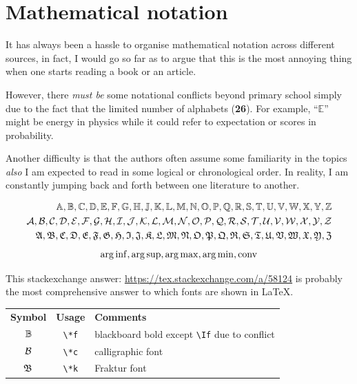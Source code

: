 \documentclass[aos,preprint]{imsart}
\begin{document}
\newpage
\section{Mathematical notation}

It has always been a hassle to organise mathematical notation across different sources,
in fact, I would go so far as to argue that this is the most annoying thing
when one starts reading a book or an article.

However, there \textit{must be} some notational conflicts beyond primary school
simply due to the fact that the limited number of alphabets (\textbf{26}).
For example, ``$\mathbb{E}$'' might be energy in physics
while it could refer to expectation or scores in probability.

Another difficulty is that the authors often assume some familiarity in the
topics
\emph{also} I am expected to read in some logical or chronological order.
In reality, I am constantly jumping back and forth between one literature to
another.

\begin{align*}
	\Af, \Bf, \Cf, \Df, \Ef, \Ff, \Gf, \Hf, \Jf, \Kf, \Lf, \Mf, \Nf, \Of, \Pf,
	\Qf, \Rf, \Sf, \Tf, \Uf, \Vf, \Wf, \Xf, \Yf, \Zf      \\
	\Ac, \Bc, \Cc, \Dc, \Ec, \Fc, \Gc, \Hc, \Ic, \Jc, \Kc, \Lc, \Mc, \Nc, \Oc,
	\Pc, \Qc, \Rc, \Sc, \Tc, \Uc, \Vc, \Wc, \Xc, \Yc, \Zc \\
	\Ak, \Bk, \Ck, \Dk, \Ek, \Fk, \Gk, \Hk, \Ik, \Jk, \Kk, \Lk, \Mk, \Nk, \Ok,
	\Pk, \Qk, \Rk, \Sk, \Tk, \Uk, \Vk, \Wk, \Xk, \Yk, \Zk
\end{align*}
$$
	\operatorname*{arg\, inf}, \operatorname*{arg\, sup}, \operatorname*{arg\, max}, \operatorname*{arg\, min}, \mathrm{conv}
$$

This stackexchange answer: \url{https://tex.stackexchange.com/a/58124}
is probably the most comprehensive answer to which fonts are shown in \LaTeX.

\begin{tabular}{ccl}
	\textbf{Symbol} & \textbf{Usage} & \textbf{Comments}                                 \\
	$\mathbb{B}$           & \verb|\*f|     & blackboard bold except \verb|\If| due to conflict \\
	$\mathcal{B}$           & \verb|\*c|     & calligraphic font                                 \\
	$\mathfrak{B}$           & \verb|\*k|     & Fraktur font                                      \\
\end{tabular}
\end{document}
